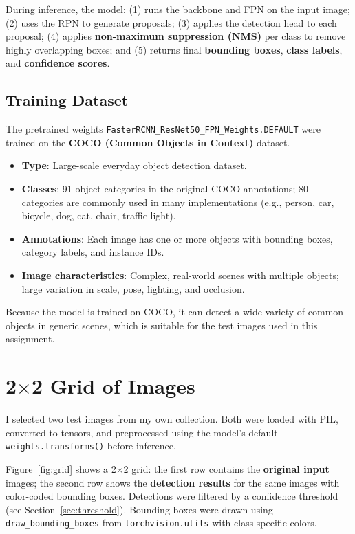 \documentclass[11pt]{article}
\begin{document}
During inference, the model: (1) runs the backbone and FPN on the input image; (2) uses the RPN to generate proposals; (3) applies the detection head to each proposal; (4) applies \textbf{non-maximum suppression (NMS)} per class to remove highly overlapping boxes; and (5) returns final \textbf{bounding boxes}, \textbf{class labels}, and \textbf{confidence scores}.

\subsection{Training Dataset}

The pretrained weights \texttt{FasterRCNN\_ResNet50\_FPN\_Weights.DEFAULT} were trained on the \textbf{COCO (Common Objects in Context)} dataset.

\begin{itemize}
  \item \textbf{Type}: Large-scale everyday object detection dataset.
  \item \textbf{Classes}: 91 object categories in the original COCO annotations; 80 categories are commonly used in many implementations (e.g., person, car, bicycle, dog, cat, chair, traffic light).
  \item \textbf{Annotations}: Each image has one or more objects with bounding boxes, category labels, and instance IDs.
  \item \textbf{Image characteristics}: Complex, real-world scenes with multiple objects; large variation in scale, pose, lighting, and occlusion.
\end{itemize}

Because the model is trained on COCO, it can detect a wide variety of common objects in generic scenes, which is suitable for the test images used in this assignment.

\section{2$\times$2 Grid of Images}

I selected two test images from my own collection. Both were loaded with PIL, converted to tensors, and preprocessed using the model's default \texttt{weights.transforms()} before inference.

Figure~\ref{fig:grid} shows a 2$\times$2 grid: the first row contains the \textbf{original input} images; the second row shows the \textbf{detection results} for the same images with color-coded bounding boxes. Detections were filtered by a confidence threshold (see Section~\ref{sec:threshold}). Bounding boxes were drawn using \texttt{draw\_bounding\_boxes} from \texttt{torchvision.utils} with class-specific colors.
\end{document}
